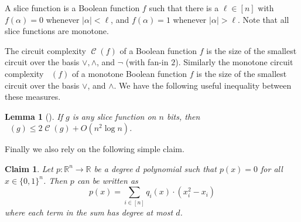 \documentclass[10pt,a4paper]{article}
\theoremstyle{plain}
\newtheorem{lemma}[theorem]{Lemma}
\newtheorem{claim}[theorem]{Claim}
\theoremstyle{remark}
\theoremstyle{definition}
\newcommand{\eqperiod}{\enspace .}
\newcommand{\set}[1]{\{#1\}}
\newcommand{\calC}{\mathcal{C}}
\newcommand{\calD}{\mathcal{D}}
\renewcommand{\R}{\mathbb{R}}
\DeclareMathOperator{\csize}{\calC}
\DeclareMathOperator{\cmonsize}{\csize_{\mathsf{mon}}}
\begin{document}


A slice function is a Boolean function $f$ such that there is a
$\ell \in [n]$ with $f(\alpha) = 0$ whenever $|\alpha| < \ell$, and
$f(\alpha) = 1$ whenever $|\alpha| > \ell$.  Note that all slice
functions are monotone.

The circuit complexity $\csize(f)$ of a Boolean function $f$ is the
size of the smallest circuit over the basis $\vee, \wedge$, and
$\lnot$ (with fan-in $2$). Similarly the monotone circuit
complexity $\cmonsize(f)$ of a monotone Boolean function $f$
is the size of the smallest circuit over the basis $\vee$, and
$\wedge$. We have the following useful inequality between these
measures.

\begin{lemma}[\cite{B82}]\label{lem:slice}
  If $g$ is any slice function on $n$ bits, then
  $\cmonsize(g) \le 2 \csize(g) + O(n^2 \log n)$.
\end{lemma}

Finally we also rely on the following simple claim.

\begin{claim}
  \label{claim:0 mod bool}
  Let $p: \R^n \rightarrow \R$ be a degree $d$ polynomial such that
  $p(x) = 0$ for all $x \in \{0,1\}^n$.  Then $p$ can be written as
  \[
    p(x) = \sum_{i \in [n]} q_i(x) \cdot (x_i^2-x_i)
  \]
  where each term in the sum has degree at most $d$.
\end{claim}
\end{document}
